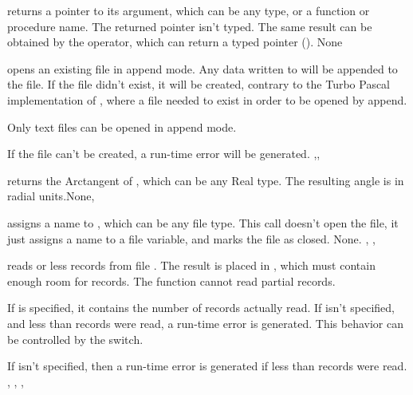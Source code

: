 \documentclass{report}
\begin{document}
\html{}

{ returns a pointer to its argument, which can be any type, or a
function or procedure name. The returned pointer isn't typed.
The same result can be obtained by the  operator, which can return a
typed pointer (\progref). }
{None}
{}

\html{}

{ opens an existing file in append mode. Any data written to
 will be appended to the file. If the file didn't exist, it will be
created, contrary to the Turbo Pascal implementation of , where
a file needed to exist in order to be opened by
append.

Only text files can be opened in append mode.
}
{If the file can't be created, a run-time error will be generated.}
{,, }

\html{}

{ returns the Arctangent of , which can be any Real type.
The resulting angle is in radial units.}{None}{, }

\html{}

{ assigns a name to , which can be any file type.
This call doesn't open the file, it just assigns a name to a file variable,
and marks the file as closed.}
{None.}
{, , }

\html{}

{ reads  or less records from file . The
result is placed in , which must contain enough room for
 records. The function cannot read partial records. 

If  is specified, it contains the number of records actually
read. If  isn't specified, and less than  records were
read, a run-time error is generated. This behavior can be controlled by the
 switch. }
{If  isn't specified, then a run-time error is generated if less
than  records were read.}
{, , , }
\end{document}
